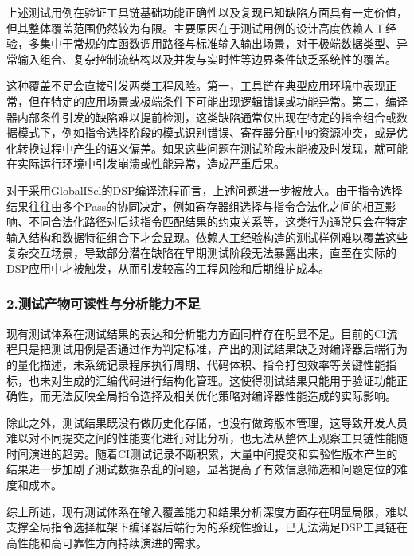 上述测试用例在验证工具链基础功能正确性以及复现已知缺陷方面具有一定价值，但其整体覆盖范围仍然较为有限。主要原因在于测试用例的设计高度依赖人工经验，多集中于常规的库函数调用路径与标准输入输出场景，对于极端数据类型、异常输入组合、复杂控制流结构以及并发与实时性等边界条件缺乏系统性的覆盖。

\par

这种覆盖不足会直接引发两类工程风险。第一，工具链在典型应用环境中表现正常，但在特定的应用场景或极端条件下可能出现逻辑错误或功能异常。第二，编译器内部条件引发的缺陷难以提前检测，这类缺陷通常仅出现在特定的指令组合或数据模式下，例如指令选择阶段的模式识别错误、寄存器分配中的资源冲突，或是优化转换过程中产生的语义偏差。如果这些问题在测试阶段未能被及时发现，就可能在实际运行环境中引发崩溃或性能异常，造成严重后果。

\par

对于采用GlobalISel的DSP编译流程而言，上述问题进一步被放大。由于指令选择结果往往由多个Pass的协同决定，例如寄存器组选择与指令合法化之间的相互影响、不同合法化路径对后续指令匹配结果的约束关系等，这类行为通常只会在特定输入结构和数据特征组合下才会显现。依赖人工经验构造的测试样例难以覆盖这些复杂交互场景，导致部分潜在缺陷在早期测试阶段无法暴露出来，直至在实际的DSP应用中才被触发，从而引发较高的工程风险和后期维护成本。


\subsubsection{2.测试产物可读性与分析能力不足}
现有测试体系在测试结果的表达和分析能力方面同样存在明显不足。目前的CI流程只是把测试用例是否通过作为判定标准，产出的测试结果缺乏对编译器后端行为的量化描述，未系统记录程序执行周期、代码体积、指令打包效率等关键性能指标，也未对生成的汇编代码进行结构化管理。这使得测试结果只能用于验证功能正确性，而无法反映全局指令选择及相关优化策略对编译器性能造成的实际影响。

\par

除此之外，测试结果既没有做历史化存储，也没有做跨版本管理，这导致开发人员难以对不同提交之间的性能变化进行对比分析，也无法从整体上观察工具链性能随时间演进的趋势。随着CI测试记录不断积累，大量中间提交和实验性版本产生的结果进一步加剧了测试数据杂乱的问题，显著提高了有效信息筛选和问题定位的难度和成本。

\par

综上所述，现有测试体系在输入覆盖能力和结果分析深度方面存在明显局限，难以支撑全局指令选择框架下编译器后端行为的系统性验证，已无法满足DSP工具链在高性能和高可靠性方向持续演进的需求。


